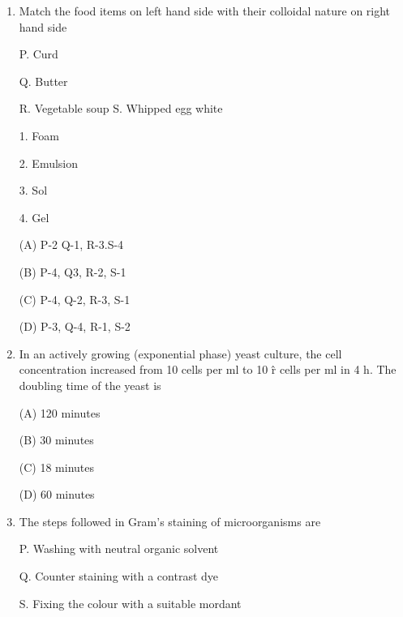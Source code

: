 \documentclass[journal]{IEEEtran}
\begin{document}
\begin{enumerate}
\begin{minipage}{0.5\textwidth}
\begin{flushleft}
2. Limonene


3. Eugenol


4. Diacetal
		\end{flushleft}
		\end{minipage}


(A) P-3.0-2, R-4.5-1 (C) P-4, Q1, R-3, S-2

(B) P-2, Q-3. R-1, S-4 (D) P-4.Q-2, R-3.S-1


\item{ Match the food items on left hand side with their colloidal nature on right hand side}
	\newline
\begin{minipage}{0.5\textwidth}
	\begin{flushleft}

P. Curd

Q. Butter

R. Vegetable soup
S. Whipped egg white

		\end{flushleft}
		\end{minipage}
	\begin{minipage}{0.5\textwidth}
		\begin{flushleft}
1. Foam


2. Emulsion


3. Sol


4. Gel
		\end{flushleft}
		\end{minipage}
\newline
(A) P-2 Q-1, R-3.S-4

(B) P-4, Q3, R-2, S-1

(C) P-4, Q-2, R-3, S-1

(D) P-3, Q-4, R-1, S-2

\item{ In an actively growing (exponential phase) yeast culture, the cell concentration increased from 10 cells per ml to 10 \^ r cells per ml in 4 h. The doubling time of the yeast is

(A) 120 minutes

(B) 30 minutes

(C) 18 minutes

(D) 60 minutes
}
\item{ The steps followed in Gram's staining of microorganisms are

P. Washing with neutral organic solvent

Q. Counter staining with a contrast dye

S. Fixing the colour with a suitable mordant

}
\end{enumerate}
\end{document}
